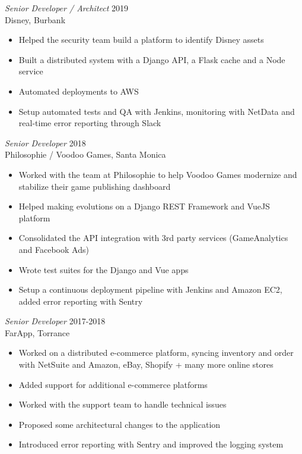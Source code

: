 \documentclass[line,resmargin]{res}
\begin{document}
\begin{resume}
{\sl Senior Developer / Architect\/} \hfill 2019\\
Disney, Burbank
\begin{itemize} \itemsep -2pt
\item Helped the security team build a platform to identify Disney assets
\item Built a distributed system with a Django API, a Flask cache and a Node service
\item Automated deployments to AWS
\item Setup automated tests and QA with Jenkins, monitoring with NetData and real-time error reporting through Slack
\end{itemize}

{\sl Senior Developer\/} \hfill 2018\\
Philosophie / Voodoo Games, Santa Monica
\begin{itemize} \itemsep -2pt
\item Worked with the team at Philosophie to help Voodoo Games modernize and stabilize their game publishing dashboard
\item Helped making evolutions on a Django REST Framework and VueJS platform
\item Consolidated the API integration with 3rd party services (GameAnalytics and Facebook Ads)
\item Wrote test suites for the Django and Vue apps
\item Setup a continuous deployment pipeline with Jenkins and Amazon EC2, added error reporting with Sentry
\end{itemize}

{\sl Senior Developer\/} \hfill 2017-2018\\
FarApp, Torrance
\begin{itemize} \itemsep -2pt
\item Worked on a distributed e-commerce platform, syncing inventory and order with NetSuite and Amazon, eBay, Shopify + many more online stores
\item Added support for additional e-commerce platforms
\item Worked with the support team to handle technical issues
\item Proposed some architectural changes to the application
\item Introduced error reporting with Sentry and improved the logging system
\end{itemize}


\end{resume}
\end{document}
